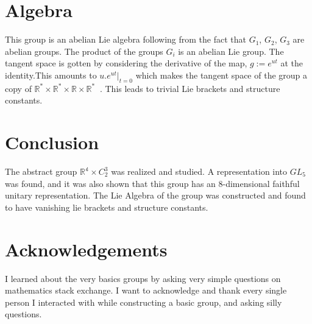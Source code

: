 \documentclass{article}
\begin{document}
\section{Algebra}
    This group is an abelian Lie algebra following from the fact that $G_1$, $G_2$,  $G_3$ are abelian groups. The product of the groups $G_i$ is an abelian Lie group. The tangent space is gotten by considering the derivative of the map, $g:= e^{ut}$ at the identity.This amounts to  $u. e^{u t}|_{t=0}$ which makes the tangent space of the group a copy of $\mathbb{R^*} \times \mathbb{R^*} \times \mathbb{R} \times \mathbb{R^*}\ $ \cite{4500869}. This  leads to trivial Lie brackets and structure constants.

\section{Conclusion}
 The abstract group  $\mathbb{R^4} \times C_2^3$ was realized and studied. A representation into $GL_5$ was found, and it was also shown that this group has an  8-dimensional faithful unitary representation. The Lie Algebra of the group was constructed and found to have vanishing lie brackets and structure constants.
 
\section*{Acknowledgements}

I learned about the very basics groups by asking very simple questions on mathematics stack exchange. I want to acknowledge and thank every single person I interacted with while constructing a basic group, and asking silly questions.
 
\printbibliography
\end{document}
